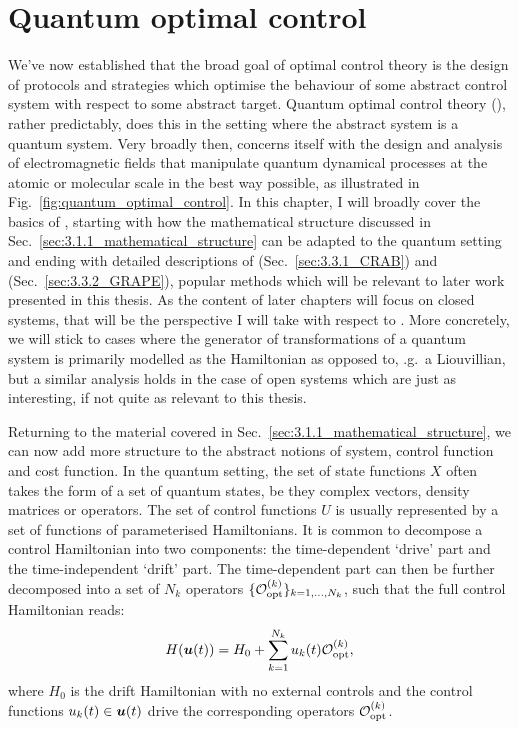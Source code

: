 \section{Quantum optimal control}\label{sec:3.2_Quantum_optimal_control}

We've now established that the broad goal of optimal control theory is the design of protocols and strategies which optimise the behaviour of some abstract control system with respect to some abstract target. Quantum optimal control theory (), rather predictably, does this in the setting where the abstract system is a quantum system. Very broadly then,  concerns itself with the design and analysis of electromagnetic fields that manipulate quantum dynamical processes at the atomic or molecular scale in the best way possible, as illustrated in Fig.~\ref{fig:quantum_optimal_control}. In this chapter, I will broadly cover the basics of , starting with how the mathematical structure discussed in Sec.~\ref{sec:3.1.1_mathematical_structure} can be adapted to the quantum setting and ending with detailed descriptions of  (Sec.~\ref{sec:3.3.1_CRAB}) and  (Sec.~\ref{sec:3.3.2_GRAPE}), popular  methods which will be relevant to later work presented in this thesis. As the content of later chapters will focus on closed systems, that will be the perspective I will take with respect to . More concretely, we will stick to cases where the generator of transformations of a quantum system is primarily modelled as the Hamiltonian as opposed to, \@e.g.~a Liouvillian, but a similar analysis holds in the case of open systems which are just as interesting, if not quite as relevant to this thesis.

Returning to the material covered in Sec.~\ref{sec:3.1.1_mathematical_structure}, we can now add more structure to the abstract notions of system, control function and cost function. In the quantum setting, the set of state functions $X$ often takes the form of a set of quantum states, be they complex vectors, density matrices or operators. The set of control functions $U$ is usually represented by a set of functions of parameterised Hamiltonians. It is common to decompose a control Hamiltonian into two components: the time-dependent `drive' part and the time-independent `drift' part. The time-dependent part can then be further decomposed into a set of $N_k$ operators $\{\mathcal{O}_{\rm opt}^{(k)}\}_{k=1,...,N_k}$, such that the full control Hamiltonian reads:
\begin{equation}\label{eq:optimal_control_H}
    H(\boldsymbol{u}(t)) = H_0 + \sum_{k = 1}^{N_k} u_k(t) \mathcal{O}_{\rm opt}^{(k)},
\end{equation}
where $H_0$ is the drift Hamiltonian with no external controls and the control functions $u_k(t) \in \boldsymbol{u}(t)$ drive the corresponding operators $\mathcal{O}_{\rm opt}^{(k)}$.

